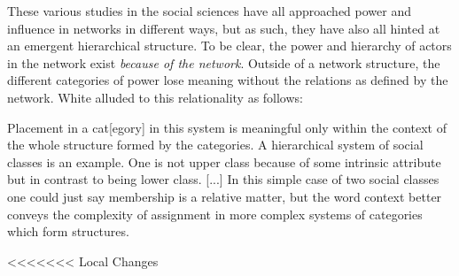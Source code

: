 \documentclass[3p,times]{elsarticle}
\begin{document}



These various studies in the social sciences have all approached power and influence in networks in different ways, but as such, they have also all hinted at an emergent hierarchical structure.
To be clear, the power and hierarchy of actors in the network exist \textit{because of the network}. Outside of a network structure, the different categories of power lose meaning without the relations as defined by the network. White alluded to this relationality as follows:
\begin{displayquote}
Placement in a cat[egory] in this system is meaningful only within the context of the whole structure formed by the categories. A hierarchical system of social classes is an example. One is not upper class because of some intrinsic attribute but in contrast to being lower class. [...] In this simple case of two social classes one could just say membership is a relative matter, but the word context better conveys the complexity of assignment in more complex systems of categories which form structures. \cite[p. 177]{white2007catnets}
\end{displayquote}
<<<<<<< Local Changes
\end{document}
